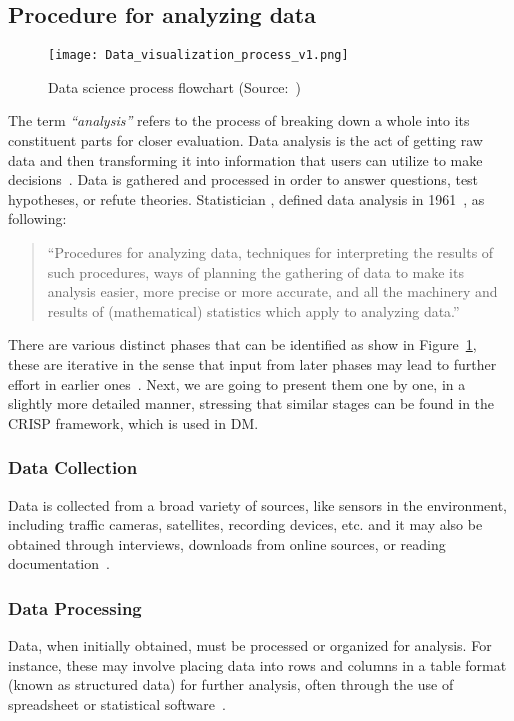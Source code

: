 \subsection{Procedure for analyzing data}
\label{subsect:data_analysis_proc}
\begin{figure}[ht]
    \centering
    \texttt{[image: Data\_visualization\_process\_v1.png]}
    \caption{Data science process flowchart (Source:~\cite{Book:doing_data_science})}
    \label{fig:data-science-flowchart}
\end{figure}
The term \textit{``analysis''} refers to the process of breaking down a whole into its constituent parts for closer evaluation.
Data analysis is the act of getting raw data and then transforming it into information that users can utilize to make decisions~\cite{Book:sbrown_2014_transforming}.
Data is gathered and processed in order to answer questions, test hypotheses, or refute theories.
Statistician \citeauthor{Article:future_of_data_tukey}, defined data analysis in 1961~\cite{Article:future_of_data_tukey}, as following:
\begin{quote}
    ``Procedures for analyzing data, techniques for interpreting the results of such procedures, ways of planning the gathering of data to make its analysis easier, 
    more precise or more accurate, and all the machinery and results of (mathematical) statistics which apply to analyzing data.''
\end{quote}
There are various distinct phases that can be identified as show in Figure~\ref{fig:data-science-flowchart}, these are iterative in the sense that input from later phases may lead to further effort in earlier ones~\cite{Book:doing_data_science}.
Next, we are going to present them one by one, in a slightly more detailed manner, stressing that similar stages can be found in the \ac{CRISP} framework, which is used in \acl{DM}.

\subsubsection{Data Collection}
Data is collected from a broad variety of sources, like sensors in the environment, including traffic cameras, satellites, recording devices, etc. and 
it may also be obtained through interviews, downloads from online sources, or reading documentation~\cite{Book:doing_data_science}.

\subsubsection{Data Processing}
Data, when initially obtained, must be processed or organized for analysis.
For instance, these may involve placing data into rows and columns in a table format (known as structured data) for further analysis, often through the use of spreadsheet or statistical software~\cite{Book:doing_data_science}.

